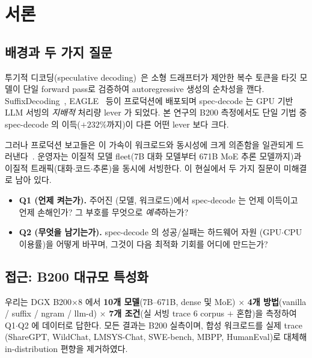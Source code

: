 
\section{서론}
\label{sec:introduction}

\subsection{배경과 두 가지 질문}

투기적 디코딩(speculative decoding)~\cite{leviathan2023spec,chen2023spec}은
소형 드래프터가 제안한 복수 토큰을 타깃 모델이 단일 forward pass로 검증하여
autoregressive 생성의 순차성을 깬다.
SuffixDecoding~\cite{snowflake-arctic}, EAGLE~\cite{li2024eagle,li2025eagle3} 등이
프로덕션에 배포되며 spec-decode 는 GPU 기반 LLM 서빙의 \emph{지배적} 처리량 lever 가 되었다.
본 연구의 B200 측정에서도 단일 기법 중 spec-decode 의 이득($+232\%$까지)이
다른 어떤 lever 보다 크다.

그러나 프로덕션 보고들은 이 가속이 워크로드와 동시성에 크게 의존함을
일관되게 드러낸다~\cite{redhat2025eagle3vllm,peagle2026vllm}.
운영자는 이질적 모델 fleet(7B 대화 모델부터 671B MoE 추론 모델까지)과
이질적 트래픽(대화$\cdot$코드$\cdot$추론)을 동시에 서빙한다.
이 현실에서 두 가지 질문이 미해결로 남아 있다.

\begin{itemize}
\item \textbf{Q1 (언제 켜는가).} 주어진 (모델, 워크로드)에서 spec-decode 는
  언제 이득이고 언제 손해인가? 그 부호를 무엇으로 \emph{예측}하는가?
\item \textbf{Q2 (무엇을 남기는가).} spec-decode 의 성공/실패는 하드웨어 자원
  (GPU$\cdot$CPU 이용률)을 어떻게 바꾸며, 그것이 다음 최적화 기회를 어디에 만드는가?
\end{itemize}

\subsection{접근: B200 대규모 특성화}

우리는 DGX B200$\times$8 에서 \textbf{10개 모델}(7B--671B, dense 및 MoE) $\times$
\textbf{4개 방법}(vanilla / suffix / ngram / llm-d) $\times$
\textbf{7개 조건}(실 서빙 trace 6 corpus $+$ 혼합)을 측정하여
Q1$\cdot$Q2 에 데이터로 답한다.
모든 결과는 B200 실측이며, 합성 워크로드를 실제 trace
(ShareGPT, WildChat, LMSYS-Chat, SWE-bench, MBPP, HumanEval)로 대체해
in-distribution 편향을 제거하였다.

